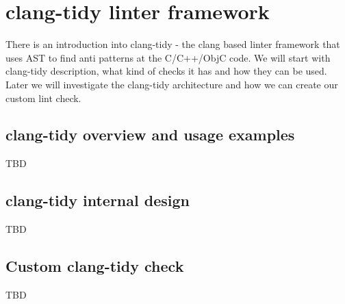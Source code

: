 \chapter{clang-tidy linter framework}
There is an introduction into clang-tidy - the clang based linter framework that
uses AST to find anti patterns at the C/C++/ObjC code. We will start with
clang-tidy description, what kind of checks it has and how they can be
used. Later we will investigate the clang-tidy architecture and how we can
create our custom lint check.

\section{clang-tidy overview and usage examples}
TBD

\section{clang-tidy internal design}

TBD

\section{Custom clang-tidy check}

TBD

